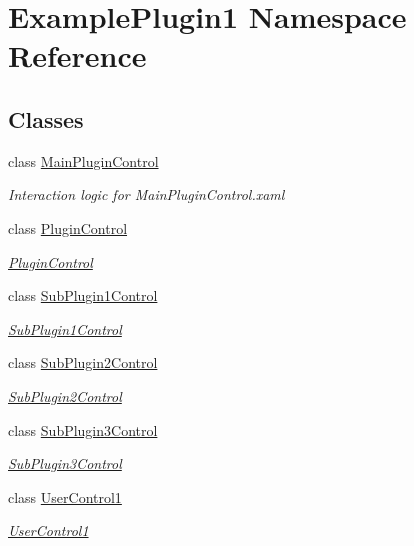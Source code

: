 \hypertarget{namespace_example_plugin1}{}\section{Example\+Plugin1 Namespace Reference}
\label{namespace_example_plugin1}
\subsection*{Classes}
\begin{DoxyCompactItemize}
\item 
class \mbox{\hyperlink{class_example_plugin1_1_1_main_plugin_control}{Main\+Plugin\+Control}}
\begin{DoxyCompactList}\small\item\em Interaction logic for Main\+Plugin\+Control.\+xaml \end{DoxyCompactList}\item 
class \mbox{\hyperlink{class_example_plugin1_1_1_plugin_control}{Plugin\+Control}}
\begin{DoxyCompactList}\small\item\em \mbox{\hyperlink{class_example_plugin1_1_1_plugin_control}{Plugin\+Control}} \end{DoxyCompactList}\item 
class \mbox{\hyperlink{class_example_plugin1_1_1_sub_plugin1_control}{Sub\+Plugin1\+Control}}
\begin{DoxyCompactList}\small\item\em \mbox{\hyperlink{class_example_plugin1_1_1_sub_plugin1_control}{Sub\+Plugin1\+Control}} \end{DoxyCompactList}\item 
class \mbox{\hyperlink{class_example_plugin1_1_1_sub_plugin2_control}{Sub\+Plugin2\+Control}}
\begin{DoxyCompactList}\small\item\em \mbox{\hyperlink{class_example_plugin1_1_1_sub_plugin2_control}{Sub\+Plugin2\+Control}} \end{DoxyCompactList}\item 
class \mbox{\hyperlink{class_example_plugin1_1_1_sub_plugin3_control}{Sub\+Plugin3\+Control}}
\begin{DoxyCompactList}\small\item\em \mbox{\hyperlink{class_example_plugin1_1_1_sub_plugin3_control}{Sub\+Plugin3\+Control}} \end{DoxyCompactList}\item 
class \mbox{\hyperlink{class_example_plugin1_1_1_user_control1}{User\+Control1}}
\begin{DoxyCompactList}\small\item\em \mbox{\hyperlink{class_example_plugin1_1_1_user_control1}{User\+Control1}} \end{DoxyCompactList}\end{DoxyCompactItemize}
